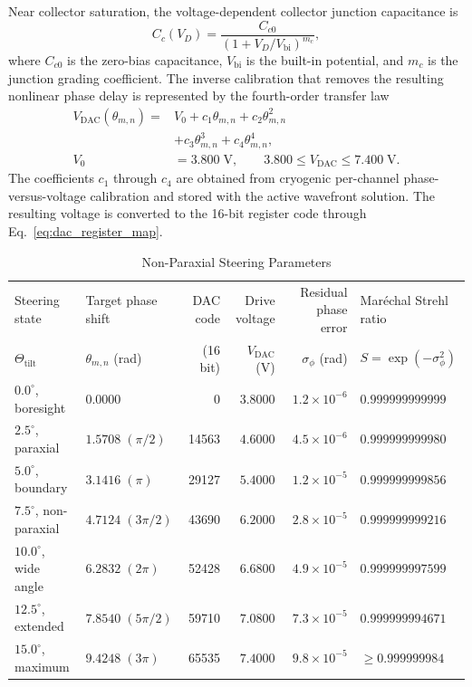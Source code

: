 \documentclass[10pt,twocolumn]{IEEEtran}
\begin{document}
Near collector saturation, the voltage-dependent collector junction
capacitance is
\begin{equation}
C_c(V_D)=\frac{C_{c0}}
{\left(1+V_D/V_{\mathrm{bi}}\right)^{m_c}},
\label{eq:collector_capacitance}
\end{equation}
where $C_{c0}$ is the zero-bias capacitance, $V_{\mathrm{bi}}$ is the built-in
potential, and $m_c$ is the junction grading coefficient.  The inverse
calibration that removes the resulting nonlinear phase delay is represented by
the fourth-order transfer law
\begin{equation}
\begin{aligned}
V_{\mathrm{DAC}}(\theta_{m,n})={}&V_0+c_1\theta_{m,n}
+c_2\theta_{m,n}^2 \\
&+c_3\theta_{m,n}^3+c_4\theta_{m,n}^4, \\
V_0&=3.800\;\mathrm{V},\qquad
3.800\leq V_{\mathrm{DAC}}\leq7.400\;\mathrm{V}.
\end{aligned}
\label{eq:quartic_dac_predistortion}
\end{equation}
The coefficients $c_1$ through $c_4$ are obtained from cryogenic per-channel
phase-versus-voltage calibration and stored with the active wavefront solution.
The resulting voltage is converted to the 16-bit register code through
Eq.~\eqref{eq:dac_register_map}.

\begin{table}[t]
\caption{Non-Paraxial Steering Parameters}
\label{tab:nonparaxial_steering}
\centering
\scriptsize
\begin{tabular}{@{}p{2.65cm}p{2.55cm}rrrp{2.65cm}@{}}
\toprule
Steering state & Target phase shift & DAC code & Drive voltage & Residual phase error & Mar\'echal Strehl ratio \\
$\Theta_{\mathrm{tilt}}$ & $\theta_{m,n}$ (rad) & (16 bit) & $V_{\mathrm{DAC}}$ (V) & $\sigma_\phi$ (rad) & $S=\exp(-\sigma_\phi^2)$ \\
\midrule
$0.0^{\circ}$, boresight & $0.0000$ & 0 & $3.8000$ & $1.2\times10^{-6}$ & $0.999999999999$ \\
$2.5^{\circ}$, paraxial & $1.5708\;(\pi/2)$ & 14563 & $4.6000$ & $4.5\times10^{-6}$ & $0.999999999980$ \\
$5.0^{\circ}$, boundary & $3.1416\;(\pi)$ & 29127 & $5.4000$ & $1.2\times10^{-5}$ & $0.999999999856$ \\
$7.5^{\circ}$, non-paraxial & $4.7124\;(3\pi/2)$ & 43690 & $6.2000$ & $2.8\times10^{-5}$ & $0.999999999216$ \\
$10.0^{\circ}$, wide angle & $6.2832\;(2\pi)$ & 52428 & $6.6800$ & $4.9\times10^{-5}$ & $0.999999997599$ \\
$12.5^{\circ}$, extended & $7.8540\;(5\pi/2)$ & 59710 & $7.0800$ & $7.3\times10^{-5}$ & $0.999999994671$ \\
$15.0^{\circ}$, maximum & $9.4248\;(3\pi)$ & 65535 & $7.4000$ & $9.8\times10^{-5}$ & $\geq0.999999984$ \\
\bottomrule
\end{tabular}
\end{table}
\end{document}
